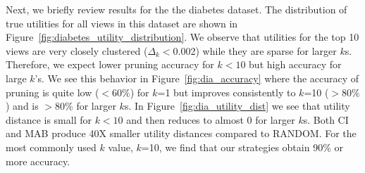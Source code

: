 
 
Next, we briefly review results for the the diabetes dataset.
The distribution of true utilities for all views in this dataset are shown in
Figure~\ref{fig:diabetes_utility_distribution}.
We observe that utilities for the top 10 views are very closely clustered ($\Delta_k<$0.002) while
they are sparse for larger $k$s.
Therefore, we expect lower pruning accuracy for $k<10$ but high accuracy for
large $k$'s.
We see this behavior in Figure~\ref{fig:dia_accuracy} where the accuracy of
pruning is quite low ($<60\%$) for $k$=1 but improves consistently to $k$=10 
($>80\%$) and is $>80\%$ for larger $k$s.
In Figure~\ref{fig:dia_utility_dist} we see that
utility distance is small for $k<10$ and then reduces to almost 0 for larger
$k$s.
Both CI and MAB produce 40X smaller utility distances compared to RANDOM.
For the most commonly used $k$ value, $k$=10, we find that our strategies obtain 
90\% or more accuracy.


